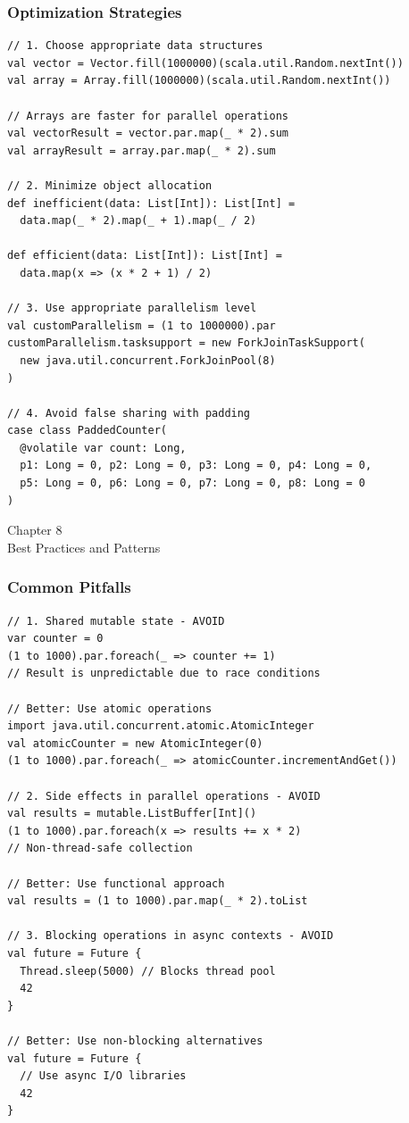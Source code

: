 \documentclass{beamer}
\newcommand{\chapterpage}[2]{
  \begin{frame}[plain]
    \centering
    \vfill
    {\usebeamerfont{title}\usebeamercolor[fg]{title}Chapter #1\\}
    \vspace{0.5cm}
    {\usebeamerfont{subtitle}#2}
    \vfill
  \end{frame}
}
\begin{document}
\begin{frame}[fragile]
\frametitle{Optimization Strategies}

\begin{lstlisting}[style=scalaStyle]
// 1. Choose appropriate data structures
val vector = Vector.fill(1000000)(scala.util.Random.nextInt())
val array = Array.fill(1000000)(scala.util.Random.nextInt())

// Arrays are faster for parallel operations
val vectorResult = vector.par.map(_ * 2).sum
val arrayResult = array.par.map(_ * 2).sum

// 2. Minimize object allocation
def inefficient(data: List[Int]): List[Int] = 
  data.map(_ * 2).map(_ + 1).map(_ / 2)

def efficient(data: List[Int]): List[Int] = 
  data.map(x => (x * 2 + 1) / 2)

// 3. Use appropriate parallelism level
val customParallelism = (1 to 1000000).par
customParallelism.tasksupport = new ForkJoinTaskSupport(
  new java.util.concurrent.ForkJoinPool(8)
)

// 4. Avoid false sharing with padding
case class PaddedCounter(
  @volatile var count: Long,
  p1: Long = 0, p2: Long = 0, p3: Long = 0, p4: Long = 0,
  p5: Long = 0, p6: Long = 0, p7: Long = 0, p8: Long = 0
)
\end{lstlisting}

\end{frame}

\chapterpage{8}{Best Practices and Patterns}

\begin{frame}[fragile]
\frametitle{Common Pitfalls}

\begin{lstlisting}[style=scalaStyle]
// 1. Shared mutable state - AVOID
var counter = 0
(1 to 1000).par.foreach(_ => counter += 1)
// Result is unpredictable due to race conditions

// Better: Use atomic operations
import java.util.concurrent.atomic.AtomicInteger
val atomicCounter = new AtomicInteger(0)
(1 to 1000).par.foreach(_ => atomicCounter.incrementAndGet())

// 2. Side effects in parallel operations - AVOID
val results = mutable.ListBuffer[Int]()
(1 to 1000).par.foreach(x => results += x * 2)
// Non-thread-safe collection

// Better: Use functional approach
val results = (1 to 1000).par.map(_ * 2).toList

// 3. Blocking operations in async contexts - AVOID
val future = Future {
  Thread.sleep(5000) // Blocks thread pool
  42
}

// Better: Use non-blocking alternatives
val future = Future {
  // Use async I/O libraries
  42
}
\end{lstlisting}

\end{frame}
\end{document}
